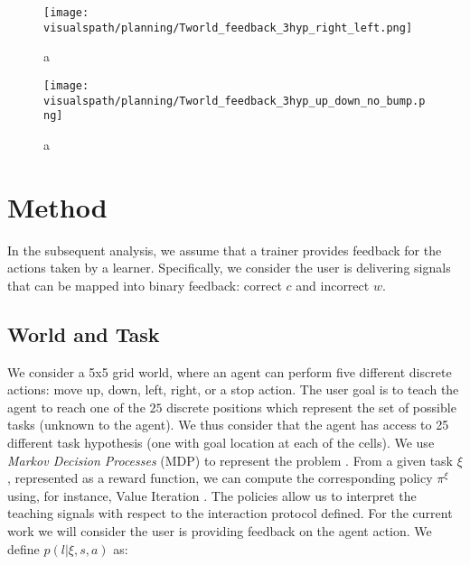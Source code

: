 \begin{figure}[!ht]
  \centering
  \texttt{[image: \\visualspath/planning/Tworld\_feedback\_3hyp\_right\_left.png]}
  \caption{a}
  \label{fig:planning3hyprightleft}
\end{figure}

\begin{figure}[!ht]
  \centering
  \texttt{[image: \\visualspath/planning/Tworld\_feedback\_3hyp\_up\_down\_no\_bump.png]}
  \caption{a}
  \label{fig:planning3hypupdown}
\end{figure}




\section{Method}

In the subsequent analysis, we assume that a trainer provides feedback for the actions taken by a learner. Specifically, we consider the user is delivering signals that can be mapped into binary feedback: correct $c$ and incorrect $w$. 

\subsection{World and Task}
We consider a 5x5 grid world, where an agent can perform five different discrete actions: move up, down, left, right, or a stop action. The user goal is to teach the agent to reach one of the $25$ discrete positions which represent the set of possible tasks (unknown to the agent). We thus consider that the agent has access to 25 different task hypothesis (one with goal location at each of the cells). We use \textit{Markov Decision Processes} (MDP) to represent the problem \cite{sutton1998reinforcement}. From a given task $\xi$, represented as a reward function, we can compute the corresponding policy $\pi^{\xi}$ using, for instance, Value Iteration \cite{sutton1998reinforcement}. The policies allow us to interpret the teaching signals with respect to the interaction protocol defined. For the current work we will consider the user is providing feedback on the agent action. We define $p(l | \xi, s, a)$ as:

